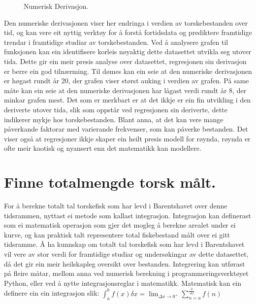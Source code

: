 \documentclass{report}
\begin{document}
\begin{figure}[H]
	\centering
	\caption{Numerisk Derivasjon.}
	\label{F4}
\end{figure}

Den numeriske derivasjonen viser her endringa i verdien av torskebestanden over tid, og kan vere eit nyttig verktøy for å forstå fortidsdata og prediktere framtidige trendar i framtidige studiar av torskebestanden.
Ved å analysere grafen til funksjonen kan ein identifisere korleis nøyaktig dette datasettet utvikla seg utover tida. Dette gir ein meir presis analyse over datasettet, regresjonen sin derivasjon er berre ein god tilnærming. Til dømes kan ein seie at den numeriske derivasjonen er høgast rundt år 20, der grafen viser størst auking i verdien av grafen.
På same måte kan ein seie at den numeriske derivasjonen har lågast verdi rundt år 8, der minkar grafen mest.
Det som er merkbart er at det ikkje er ein fin utvikling i den deriverte utover tida, slik som oppstår ved regresjonen sin deriverte, dette indikerer mykje hos torskebestanden. Blant anna, at det kan vere mange påverkande faktorar med varierande frekvenser, som kan påverke bestanden.
Det viser også at regresjoner ikkje skaper ein heilt presis modell for røynda, røynda er ofte meir kaotisk og nyansert enn det matematikk kan modellere.
\section{Finne totalmengde torsk målt.}
For å berekne totalt tal torskefisk som har levd i Barentshavet over denne tidsrammen, nyttast ei metode som kallast integrasjon.
Integrasjon kan definerast som ei matematisk operasjon som gjer det mogleg å berekne arealet under ei kurve, og kan praktisk talt representere total fiskebestand målt over ei gitt tidsramme.
Å ha kunnskap om totalt tal torskefisk som har levd i Barentshavet vil vere av stor verdi for framtidige studiar og undersøkingar av dette datasettet, då det gir ein meir heilskapleg oversikt over bestanden.
Integrering kan utførast på fleire måtar, mellom anna ved numerisk berekning i programmeringsverktøyet Python, eller ved å nytte integrasjonsreglar i matematikk.
Matematisk kan ein definere ein ein integrasjon slik: $\int_{a}^{b}f(x)\delta x=\lim_{\Delta x \rightarrow 0^{+}}\sum_{n=a}^{\frac{b}{\Delta x}}f(n)$
\end{document}
